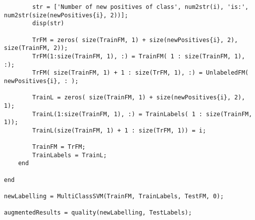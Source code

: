 \documentclass[12pt,twoside,notitlepage,amsart]{report} %
\begin{document}
\begin{lstlisting}
        str = ['Number of new positives of class', num2str(i), 'is:', num2str(size(newPositives{i}, 2))];
        disp(str)
        
        TrFM = zeros( size(TrainFM, 1) + size(newPositives{i}, 2), size(TrainFM, 2));
        TrFM(1:size(TrainFM, 1), :) = TrainFM( 1 : size(TrainFM, 1), :);
        TrFM( size(TrainFM, 1) + 1 : size(TrFM, 1), :) = UnlabeledFM( newPositives{i}, : );

        TrainL = zeros( size(TrainFM, 1) + size(newPositives{i}, 2), 1);
        TrainL(1:size(TrainFM, 1), :) = TrainLabels( 1 : size(TrainFM, 1));
        TrainL(size(TrainFM, 1) + 1 : size(TrFM, 1)) = i;

        TrainFM = TrFM;
        TrainLabels = TrainL;
    end
    
end

newLabelling = MultiClassSVM(TrainFM, TrainLabels, TestFM, 0);

augmentedResults = quality(newLabelling, TestLabels);
    
\end{lstlisting}
%	
%	
%
%
%
%
%
%
\end{document}
